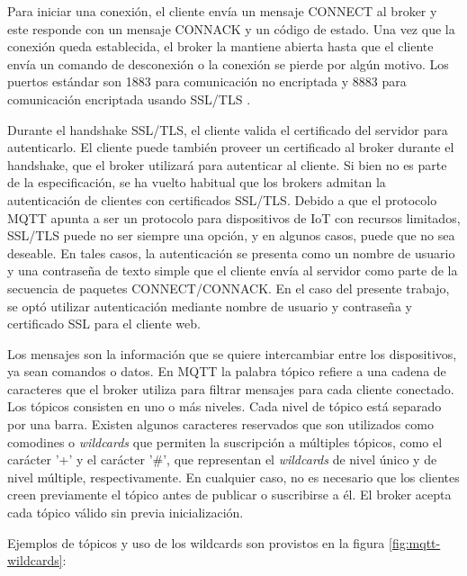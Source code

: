 Para iniciar una conexión, el cliente envía un mensaje CONNECT al broker y este responde con un mensaje CONNACK y un código de estado. Una vez que la conexión queda establecida, el broker la mantiene abierta hasta que el cliente envía un comando de desconexión o la conexión se pierde por algún motivo. Los puertos estándar son 1883 para comunicación no encriptada y 8883 para comunicación encriptada usando SSL/TLS \citep{WEBSITE:17}.

Durante el handshake SSL/TLS, el cliente valida el certificado del servidor para autenticarlo. El cliente puede también proveer un certificado al broker durante el handshake, que el broker utilizará para autenticar al cliente. Si bien no es parte de la especificación, se ha vuelto habitual que los brokers admitan la autenticación de clientes con certificados SSL/TLS. Debido a que el protocolo MQTT apunta a ser un protocolo para dispositivos de IoT con recursos limitados, SSL/TLS puede no ser siempre una opción, y en algunos casos, puede que no sea deseable. En tales casos, la autenticación se presenta como un nombre de usuario y una contraseña de texto simple que el cliente envía al servidor como parte de la secuencia de paquetes CONNECT/CONNACK.  En el caso del presente trabajo, se optó utilizar autenticación mediante nombre de usuario y contraseña y certificado SSL para el cliente web.

Los mensajes son la información que se quiere intercambiar entre los dispositivos, ya sean comandos o datos. En MQTT la palabra tópico refiere a una cadena de caracteres que el broker utiliza para filtrar mensajes para cada cliente conectado. Los tópicos consisten en uno o más niveles. Cada nivel de tópico está separado por una barra. Existen algunos caracteres reservados que son utilizados como comodines o \textit{wildcards} que permiten la suscripción a múltiples tópicos, como el carácter '+' y el carácter '\#', que representan el  \textit{wildcards} de nivel único y de nivel múltiple, respectivamente. En cualquier caso, no es necesario que los clientes creen previamente el tópico antes de publicar o suscribirse a él. El broker acepta cada tópico válido sin previa inicialización.

Ejemplos de tópicos y uso de los wildcards son provistos en la figura \ref{fig:mqtt-wildcards}:

